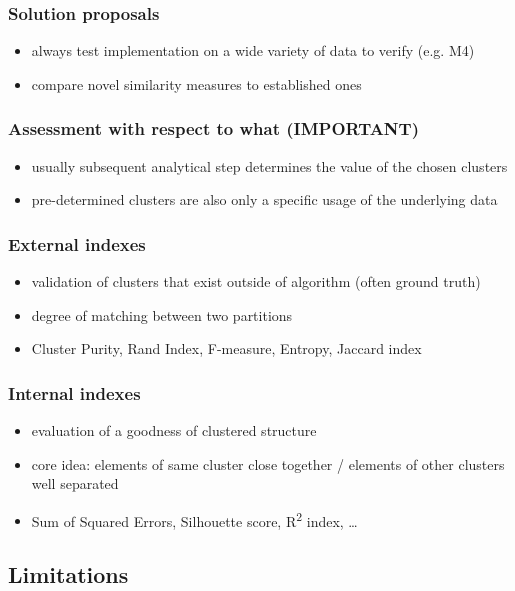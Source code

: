 \documentclass[11pt]{article}
\begin{document}
\subsubsection*{Solution proposals}
\label{sec:org1c1c1fa}
\begin{itemize}
\item always test implementation on a wide variety of data to verify (e.g. M4)
\item compare novel similarity measures to established ones
\end{itemize}
\subsubsection*{Assessment with respect to what (IMPORTANT)}
\label{sec:org3297859}
\begin{itemize}
\item usually subsequent analytical step determines the value of the chosen clusters
\item pre-determined clusters are also only a specific usage of the underlying data
\end{itemize}
\subsubsection*{External indexes}
\label{sec:orgec34744}
\begin{itemize}
\item validation of clusters that exist outside of algorithm (often ground truth)
\item degree of matching between two partitions
\item Cluster Purity, Rand Index, F-measure, Entropy, Jaccard index
\end{itemize}
\subsubsection*{Internal indexes}
\label{sec:orgee54541}
\begin{itemize}
\item evaluation of a goodness of clustered structure
\item core idea: elements of same cluster close together / elements of other clusters well separated
\item Sum of Squared Errors, Silhouette score, R\textsuperscript{2} index, \ldots{}
\end{itemize}

\subsection*{Limitations}
\label{sec:org4608330}
\end{document}
